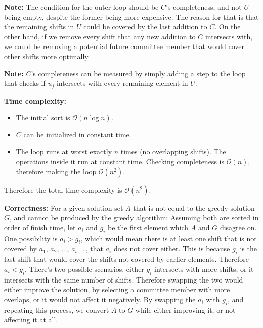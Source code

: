 \documentclass[12pt, letterpaper]{article}
\begin{document}
\noindent\textbf{Note:} The condition for the outer loop should be $C$'s completeness, and not $U$ being empty, despite the former being more expensive.
The reason for that is that the remaining shifts in $U$ could be covered by the last addition to $C$.
On the other hand, if we remove every shift that any new addition to $C$ intersects with, we could be removing a potential future committee member that would cover other shifts more optimally.

\noindent\textbf{Note:} $C$'s completeness can be measured by simply adding a step to the loop that checks if $u_j$ intersects with every remaining element in $U$.

\vspace{7.5mm}
\noindent\textbf{Time complexity:} 
\begin{itemize}
    \item The initial sort is $\mathcal{O}(n \log n)$.
    \item $C$ can be initialized in constant time.
    \item The loop runs at worst exactly $n$ times (no overlapping shifts). The operations inside it run at constant time.  Checking completeness is $\mathcal{O}(n)$, therefore making the loop $\mathcal{O}(n^2)$.
\end{itemize}
Therefore the total time complexity is $\mathcal{O}(n^2)$.

\vspace{7.5mm}
\noindent \textbf{Correctness:}
For a given solution set $A$ that is not equal to the greedy solution $G$, and cannot be produced by the greedy algorithm:
Assuming both are sorted in order of finish time, let $a_i$ and $g_i$ be the first element which $A$ and $G$ disagree on.
One possibility is $a_i > g_i$, which would mean there is at least one shift that is not covered by $a_1$, $a_2$, ..., $a_{i-1}$, that $a_i$ does not cover either.
This is because $g_i$ is the last shift that would cover the shifts not covered by earlier elements.
Therefore $a_i < g_i$.
There's two possible scenarios, either $g_i$ intersects with more shifts, or it intersects with the same number of shifts.
Therefore swapping the two would either improve the solution, by selecting a committee member with more overlaps, or it would not affect it negatively.
By swapping the $a_i$ with $g_i$, and repeating this process, we convert $A$ to $G$ while either improving it, or not affecting it at all.
\end{document}
